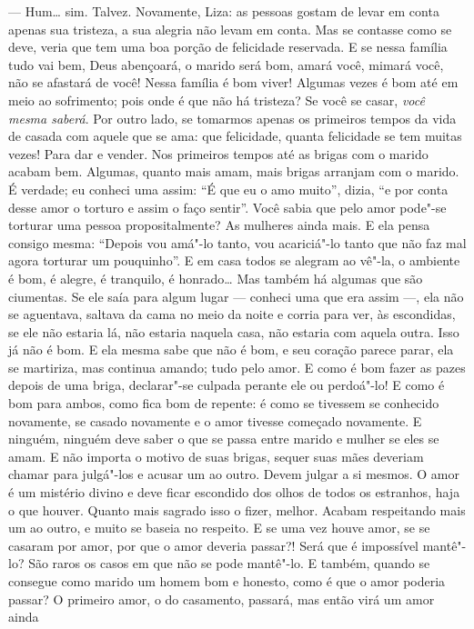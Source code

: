 --- Hum\ldots{} sim. Talvez. Novamente, Liza: as pessoas gostam de levar em
conta apenas sua tristeza, a sua alegria não levam em conta. Mas se
contasse como se deve, veria que tem uma boa porção de felicidade
reservada. E se nessa família tudo vai bem, Deus abençoará, o marido
será bom, amará você, mimará você, não se afastará de você! Nessa
família é bom viver! Algumas vezes é bom até em meio ao sofrimento;
pois onde é que não há tristeza? Se você se casar,
\textit{você mesma saberá}. Por
outro lado, se tomarmos apenas os primeiros tempos da vida de casada
com aquele que se ama: que felicidade, quanta felicidade se tem muitas
vezes! Para dar e vender. Nos primeiros tempos até as brigas com o
marido acabam bem. Algumas, quanto mais amam, mais brigas arranjam com
o marido. É verdade; eu conheci uma assim: “É que eu o amo muito”,
dizia, “e por conta desse amor o torturo e assim o faço sentir”. Você
sabia que pelo amor pode"-se torturar uma pessoa propositalmente? As
mulheres ainda mais. E ela pensa consigo mesma: “Depois vou amá"-lo
tanto, vou acariciá"-lo tanto que não faz mal agora torturar um
pouquinho”. E em casa todos se alegram ao vê"-la, o ambiente é bom, é
alegre, é tranquilo, é honrado\ldots{} Mas também há algumas que são
ciumentas. Se ele saía para algum lugar --- conheci uma que era assim ---,
ela não se aguentava, saltava da cama no meio da noite e corria para
ver, às escondidas, se ele não estaria lá, não estaria naquela casa,
não estaria com aquela outra. Isso já não é bom. E ela mesma sabe que
não é bom, e seu coração parece parar, ela se martiriza, mas continua
amando; tudo pelo amor. E como é bom fazer as pazes depois de uma
briga, declarar"-se culpada perante ele ou perdoá"-lo! E como é bom para
ambos, como fica bom de repente: é como se tivessem se conhecido
novamente, se casado novamente e o amor tivesse começado novamente. E
ninguém, ninguém deve saber o que se passa entre marido e mulher se
eles se amam. E não importa o motivo de suas brigas, sequer suas mães
deveriam chamar para julgá"-los e acusar um ao outro. Devem julgar a si
mesmos. O amor é um mistério divino e deve ficar escondido dos olhos de
todos os estranhos, haja o que houver. Quanto mais sagrado isso o
fizer, melhor. Acabam respeitando mais um ao outro, e muito se baseia
no respeito. E se uma vez houve amor, se se casaram por amor, por que o
amor deveria passar?! Será que é impossível mantê"-lo? São raros os
casos em que não se pode mantê"-lo. E também, quando se consegue como
marido um homem bom e honesto, como é que o amor poderia passar? O
primeiro amor, o do casamento, passará, mas então virá um amor ainda
